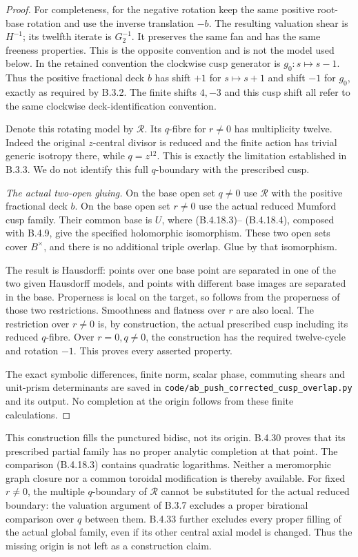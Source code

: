 \begin{proof}
For completeness, for the negative rotation keep the same positive
root-base rotation and use the inverse translation
$-b$. The resulting valuation shear is $H^{-1}$;
its twelfth iterate is $G_2^{-1}$. It preserves
the same fan and has the same freeness properties.
This is the opposite convention and is not the model
used below. In the retained convention the clockwise
cusp generator is $g_0:s\mapsto s-1$. Thus the
positive fractional deck $b$ has shift $+1$ for
$s\mapsto s+1$ and shift $-1$ for $g_0$, exactly
as required by B.3.2. The finite shifts $4,-3$
and this cusp shift all refer to the same clockwise
deck-identification convention.

Denote this rotating model by $\mathcal R$.
Its $q$-fibre for $r\ne0$ has multiplicity twelve.
Indeed the original $z$-central divisor is reduced
and the finite action has trivial generic isotropy
there, while $q=z^{12}$. This is exactly the
limitation established in B.3.3. We do not identify
this full $q$-boundary with the prescribed cusp.

\emph{The actual two-open gluing.}
On the base open set $q\ne0$ use $\mathcal R$ with
the positive fractional deck $b$. On the base open set $r\ne0$
use the actual reduced Mumford cusp family.
Their common base is $U$, where (B.4.18.3)--
(B.4.18.4), composed with B.4.9, give the specified
holomorphic isomorphism. These two open sets cover
$B^\times$, and there is no additional triple
overlap. Glue by that isomorphism.

The result is Hausdorff: points over one base
point are separated in one of the two given
Hausdorff models, and points with different
base images are separated in the base.
Properness is local on the target, so follows
from the properness of those two restrictions.
Smoothness and flatness over $r$ are also local.
The restriction over $r\ne0$ is, by construction,
the actual prescribed cusp including its reduced
$q$-fibre. Over $r=0,q\ne0$, the construction has
the required twelve-cycle and rotation $-1$.
This proves every asserted property.

The exact symbolic differences, finite norm,
scalar phase, commuting shears and unit-prism
determinants are saved in
\texttt{code/ab\_push\_corrected\_cusp\_overlap.py}
and its output. No completion at the origin
follows from these finite calculations.
\end{proof}

\begin{remark}
This construction fills the punctured bidisc, not its
origin. B.4.30 proves that its prescribed partial family
has no proper analytic completion at that point.
The comparison (B.4.18.3) contains quadratic
logarithms. Neither a meromorphic graph closure
nor a common toroidal modification is thereby
available. For fixed $r\ne0$, the multiple
$q$-boundary of $\mathcal R$ cannot be substituted
for the actual reduced boundary: the valuation
argument of B.3.7 excludes a proper birational
comparison over $q$ between them. B.4.33 further
excludes every proper filling of the actual global family,
even if its other central axial model is changed. Thus
the missing origin is not left as a construction claim.
\end{remark}

